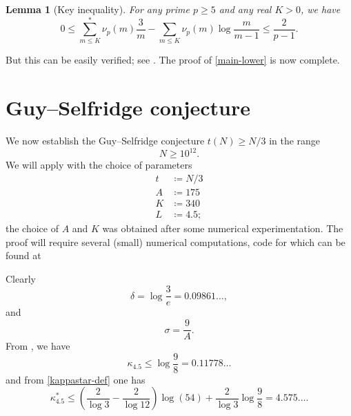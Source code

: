 \documentclass[12pt,a4paper,reqno]{amsart}
\numberwithin{equation}{section}
\theoremstyle{plain}
\newtheorem{lemma}[theorem]{Lemma}
\theoremstyle{definition}
\begin{document}
\begin{lemma}[Key inequality]\label{key-ineq} For any prime $p\geq 5$ and any real $K > 0$, we have
$$ 0 \leq \sum_{m \leq K}^* \nu_p(m) \frac{3}{m} - \sum_{m \leq K} \nu_p(m) \log \frac{m}{m-1} \leq \frac{2}{p-1}.$$
\end{lemma}

But this can be easily verified; see .  The proof of \eqref{main-lower} is now complete.

\section{Guy--Selfridge conjecture}

We now establish the Guy--Selfridge conjecture $t(N) \geq N/3$ in the range
$$ N \geq 10^{12}.$$
We will apply  with the choice of parameters
\begin{align*}
  t &\coloneqq N/3\\
  A &\coloneqq 175\\
  K &\coloneqq 340 \\
  L &\coloneqq 4.5;
\end{align*}
the choice of $A$ and $K$ was obtained after some numerical experimentation.  The proof will require several (small) numerical computations, code for which can be found at \url{}


Clearly 
\begin{equation}\label{delta-exact}
  \delta = \log \frac{3}{e} = 0.09861\dots, 
\end{equation}
and
$$ \sigma = \frac{9}{A}.$$
From , we have
\begin{equation}\label{kappa-k}
  \kappa_{4.5} \leq \log \frac{9}{8} = 0.11778\dots
\end{equation}
and from \eqref{kappastar-def} one has
\begin{equation}\label{kappa-star-def}
 \kappa^*_{4.5} \leq \left(\frac{2}{\log 3} - \frac{2}{\log 12}\right) \log(54) + \frac{2}{\log 3} \log \frac{9}{8} = 4.575\dots.
\end{equation}
\end{document}
